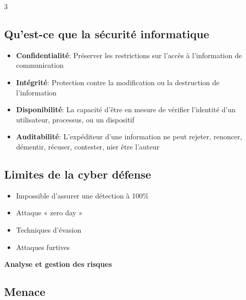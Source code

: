 \documentclass[9pt, a4paper, twoside]{article}
\begin{document}

\begin{multicols}{3}

\footnotesize \subsection{Qu'est-ce que la sécurité informatique}

\begin{itemize}[leftmargin=0.5em,label=$\bullet$]
    \item \scriptsize\textbf{Confidentialité}: Préserver les restrictions sur l'accès à l'information de communication
    \item \scriptsize\textbf{Intégrité}: Protection contre la modification ou la destruction de l'information
    \item \scriptsize\textbf{Disponibilité}: La capacité d'être en mesure de vérifier l'identité d'un utilisateur, processus, ou un dispositif
    \item \scriptsize\textbf{Auditabilité}: L'expéditeur d'une information ne peut rejeter, renoncer, démentir, récuser, contester, nier être l'auteur
\end{itemize}

\footnotesize \subsection{Limites de la cyber défense}

\begin{itemize}[leftmargin=0.5em,label=$\bullet$]
    \item \scriptsize Impossible d'assurer une détection à 100$\%$
    \item \scriptsize Attaque « zero day »
    \item \scriptsize Techniques d'évasion
    \item \scriptsize Attaques furtives
\end{itemize}

\begin{flushleft}
    \scriptsize \textbf{Analyse et gestion des risques}
\end{flushleft}

\footnotesize \subsection{Menace}


\end{multicols}
\end{document}

